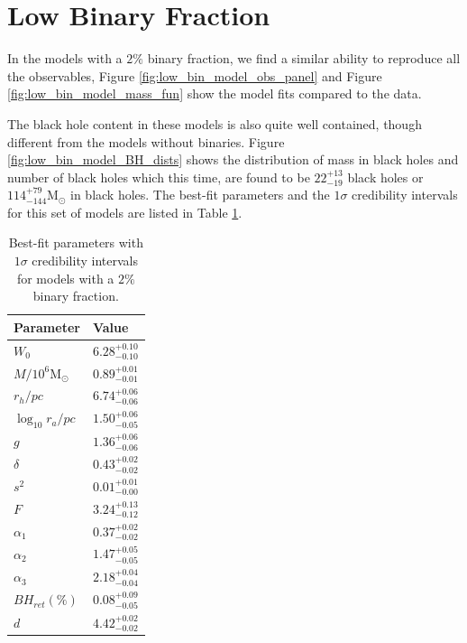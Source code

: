 \section{Low Binary Fraction}

In the models with a $2\%$ binary fraction, we find a similar ability to reproduce all the
observables, Figure \ref{fig:low_bin_model_obs_panel} and Figure \ref{fig:low_bin_model_mass_fun}
show the model fits compared to the data.

The black hole content in these models is also quite well contained, though different from the
models without binaries. Figure \ref{fig:low_bin_model_BH_dists} shows the distribution of mass in
black holes and number of black holes which this time, are found to be $22^{+13}_{-19}$ black holes or
$114^{+79}_{-144} \mathrm{M}_\odot$ in black holes. The best-fit parameters and the $1\sigma$ credibility
intervals for this set of models are listed in Table \ref{tab:parameters_lowbin}.


\begin{table}
	\centering
	\caption{Best-fit parameters with $1\sigma$ credibility intervals for models with a $2\%$ binary fraction.}
	\begin{tabular}{l l}

		\hline
		Parameter                 & Value                  \\
		\hline
		$W_0$                     & $6.28^{+0.10}_{-0.10}$ \\
		$M/10^6 \mathrm{M}_\odot$ & $0.89^{+0.01}_{-0.01}$ \\
		$r_h / pc$                & $6.74^{+0.06}_{-0.06}$ \\
		$\log_{10}{r_a / pc}$     & $1.50^{+0.06}_{-0.05}$ \\
		$g$                       & $1.36^{+0.06}_{-0.06}$ \\
		$\delta$                  & $0.43^{+0.02}_{-0.02}$ \\
		$s^2$                     & $0.01^{+0.01}_{-0.00}$ \\
		$F$                       & $3.24^{+0.13}_{-0.12}$ \\
		$\alpha_1$                & $0.37^{+0.02}_{-0.02}$ \\
		$\alpha_2$                & $1.47^{+0.05}_{-0.05}$ \\
		$\alpha_3$                & $2.18^{+0.04}_{-0.04}$ \\
		$BH_{ret} (\%)$           & $0.08^{+0.09}_{-0.05}$ \\
		$d$                       & $4.42^{+0.02}_{-0.02}$ \\
		\hline
	\end{tabular}
	\label{tab:parameters_lowbin}
\end{table}

